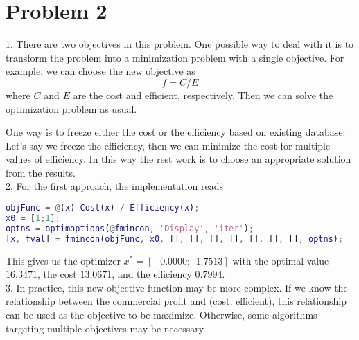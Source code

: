 \documentclass[a4paper]{article}
\begin{document}
\section*{Problem 2}
1. There are two objectives in this problem. One possible way to deal with it is to transform the problem into a minimization problem with a single objective. For example, we can choose the new objective as
\begin{equation*}
f = C/E
\end{equation*}
where $C$ and $E$ are the cost and efficient, respectively. Then we can solve the optimization problem as usual.

One way is to freeze either the cost or the efficiency based on existing database. Let's say we freeze the efficiency, then we can minimize the cost for multiple values of efficiency. In this way the rest work is to choose an appropriate solution from the results.\\
2. For the first approach, the implementation reads
\begin{lstlisting}[language=Matlab]
objFunc = @(x) Cost(x) / Efficiency(x);
x0 = [1;1];
optns = optimoptions(@fmincon, 'Display', 'iter');
[x, fval] = fmincon(objFunc, x0, [], [], [], [], [], [], [], optns);
\end{lstlisting}
This gives us the optimizer $x^* = [-0.0000; 
 \:\:1.7513]$ with the optimal value $16.3471$, the cost $13.0671$, and the efficiency $0.7994$. \\ 
 3. In practice, this new objective function may be more complex. If we know the relationship between the commercial profit and (cost, efficient), this relationship can be used as the objective to be maximize. Otherwise, some algorithms targeting  multiple objectives may be necessary.
\end{document}
